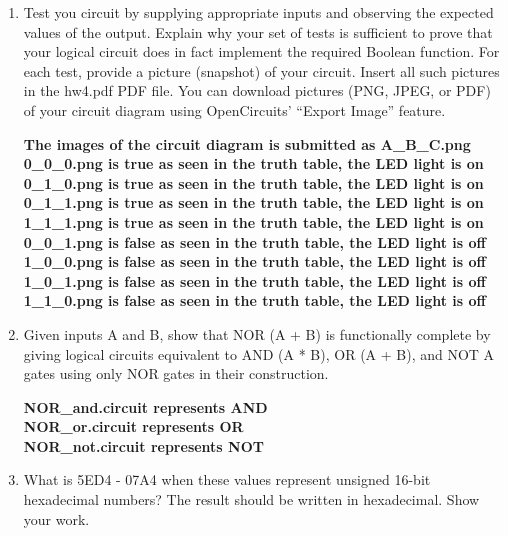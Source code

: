 \documentclass{article}
\begin{document}
\begin{enumerate}
\begin{center}
        \end{center}
        \item Test you circuit by supplying appropriate inputs and observing the expected values of the
        output. Explain why your set of tests is sufficient to prove that your logical circuit does in
        fact implement the required Boolean function. For each test, provide a picture (snapshot) of
        your circuit. Insert all such pictures in the hw4.pdf PDF file. You can download pictures
        (PNG, JPEG, or PDF) of your circuit diagram using OpenCircuits’ “Export Image” feature.
        \begin{center}
            \textbf{The images of the circuit diagram is submitted as A\_B\_C.png}\\[0.25in]
            \textbf{0\_0\_0.png is true as seen in the truth table, the LED light is on}\\
            \textbf{0\_1\_0.png is true as seen in the truth table, the LED light is on}\\
            \textbf{0\_1\_1.png is true as seen in the truth table, the LED light is on}\\
            \textbf{1\_1\_1.png is true as seen in the truth table, the LED light is on}\\
            \textbf{0\_0\_1.png is false as seen in the truth table, the LED light is off}\\
            \textbf{1\_0\_0.png is false as seen in the truth table, the LED light is off}\\
            \textbf{1\_0\_1.png is false as seen in the truth table, the LED light is off}\\
            \textbf{1\_1\_0.png is false as seen in the truth table, the LED light is off}\\
        \end{center}
        \item Given inputs A and B, show that NOR {(A + B)} is functionally complete by giving logical
        circuits equivalent to AND {(A * B)}, OR {(A + B)}, and NOT {A} gates using only NOR
        gates in their construction.
        \begin{center}
            \textbf{NOR\_and.circuit represents AND}\\
            \textbf{NOR\_or.circuit represents OR}\\
            \textbf{NOR\_not.circuit represents NOT}
        \end{center}
        \item What is 5ED4 - 07A4 when these values represent unsigned 16-bit hexadecimal numbers? The result should be written in hexadecimal. Show your work.

\end{enumerate}
\end{document}
